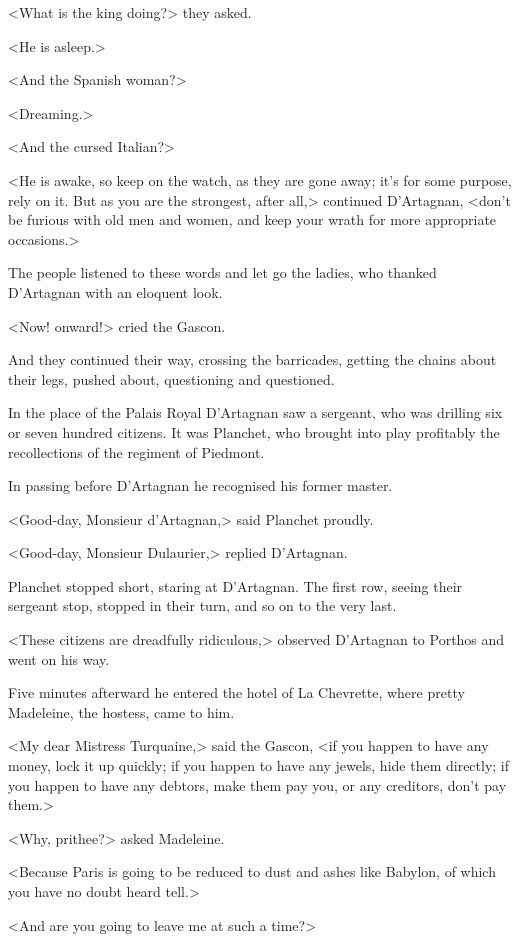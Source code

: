 <What is the king doing?> they asked.

<He is asleep.>

<And the Spanish woman?>

<Dreaming.>

<And the cursed Italian?>

<He is awake, so keep on the watch, as they are gone away; it's for some purpose, rely on it. But as you are the strongest, after all,> continued D'Artagnan, <don't be furious with old men and women, and keep your wrath for more appropriate occasions.>

The people listened to these words and let go the ladies, who thanked D'Artagnan with an eloquent look.

<Now! onward!> cried the Gascon.

And they continued their way, crossing the barricades, getting the chains about their legs, pushed about, questioning and questioned.

In the place of the Palais Royal D'Artagnan saw a sergeant, who was drilling six or seven hundred citizens. It was Planchet, who brought into play profitably the recollections of the regiment of Piedmont.

In passing before D'Artagnan he recognised his former master.

<Good-day, Monsieur d'Artagnan,> said Planchet proudly.

<Good-day, Monsieur Dulaurier,> replied D'Artagnan.

Planchet stopped short, staring at D'Artagnan. The first row, seeing their sergeant stop, stopped in their turn, and so on to the very last.

<These citizens are dreadfully ridiculous,> observed D'Artagnan to Porthos and went on his way.

Five minutes afterward he entered the hotel of La Chevrette, where pretty Madeleine, the hostess, came to him.

<My dear Mistress Turquaine,> said the Gascon, <if you happen to have any money, lock it up quickly; if you happen to have any jewels, hide them directly; if you happen to have any debtors, make them pay you, or any creditors, don't pay them.>

<Why, prithee?> asked Madeleine.

<Because Paris is going to be reduced to dust and ashes like Babylon, of which you have no doubt heard tell.>

<And are you going to leave me at such a time?>

